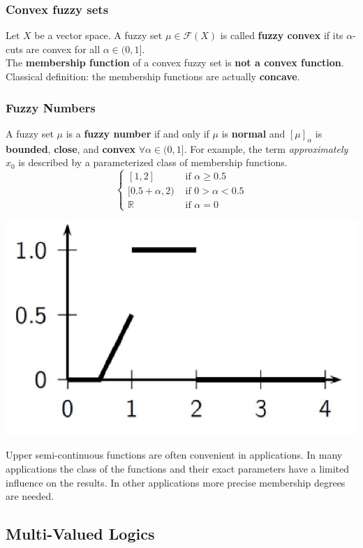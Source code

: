 \documentclass[11pt]{article}
\begin{document}
		\newpage
		
		\subsubsection{Convex fuzzy sets}
		Let $X$ be a vector space. A fuzzy set $\mu \in \mathcal{F} (X)$ is called \textbf{fuzzy convex} if its $\alpha$-cuts are convex for all $\alpha \in (0,1]$.\\
		
		The \textbf{membership function} of a convex fuzzy set is \textbf{not a convex function}.\\
		
		Classical definition: the membership functions are actually \textbf{concave}.\\
		
		\subsubsection{Fuzzy Numbers}
		A fuzzy set $\mu$ is a \textbf{fuzzy number} if and only if $\mu$ is \textbf{normal} and $[\mu]_\alpha$ is \textbf{bounded}, \textbf{close}, and \textbf{convex} $\forall \alpha \in (0, 1]$. For example, the term \textit{approximately} $x_0$ is described by a parameterized class of membership functions.
		$$ 
		\begin{cases}
			[1, 2] & \text{ if } \alpha \geq 0.5 \\
			[0.5 + \alpha, 2) & \text{ if } 0 > \alpha < 0.5 \\
			\mathbb{R} & \text{ if } \alpha = 0
		\end{cases}
		$$
		\begin{center}
			\includegraphics[width=0.4\columnwidth]{img/FS/numbers1}
		\end{center}
		Upper semi-continuous functions are often convenient in applications. In many applications the class of the functions and their exact parameters have a limited influence on the results. In other applications more precise membership degrees are needed. \\
		
		\newpage
		
		\subsection{Multi-Valued Logics}
		
\end{document}
